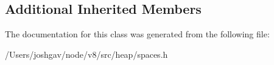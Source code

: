 \subsection*{Additional Inherited Members}


The documentation for this class was generated from the following file\+:\begin{DoxyCompactItemize}
\item 
/\+Users/joshgav/node/v8/src/heap/spaces.\+h\end{DoxyCompactItemize}

